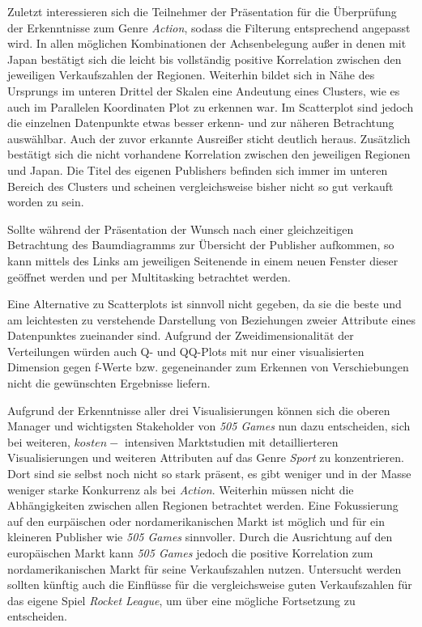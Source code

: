 \documentclass[usegeometry=true]{scrartcl}
\begin{document}
Zuletzt interessieren sich die Teilnehmer der Präsentation für die Überprüfung der Erkenntnisse zum Genre \textit{Action}, sodass die Filterung entsprechend angepasst wird. 
In allen möglichen Kombinationen der Achsenbelegung außer in denen mit Japan bestätigt sich die leicht bis vollständig positive Korrelation zwischen den jeweiligen Verkaufszahlen der Regionen.
Weiterhin bildet sich in Nähe des Ursprungs im unteren Drittel der Skalen eine Andeutung eines Clusters, wie es auch im Parallelen Koordinaten Plot zu erkennen war. 
Im Scatterplot sind jedoch die einzelnen Datenpunkte etwas besser erkenn- und zur näheren Betrachtung auswählbar. 
Auch der zuvor erkannte Ausreißer sticht deutlich heraus. 
Zusätzlich bestätigt sich die nicht vorhandene Korrelation zwischen den jeweiligen Regionen und Japan.
Die Titel des eigenen Publishers befinden sich immer im unteren Bereich des Clusters und scheinen vergleichsweise bisher nicht so gut verkauft worden zu sein. 

Sollte während der Präsentation der Wunsch nach einer gleichzeitigen Betrachtung des Baumdiagramms zur Übersicht der Publisher aufkommen, so kann mittels des Links am jeweiligen Seitenende in einem neuen Fenster dieser geöffnet werden und per Multitasking betrachtet werden.

Eine Alternative zu Scatterplots ist sinnvoll nicht gegeben, da sie die beste und am leichtesten zu verstehende Darstellung von Beziehungen zweier Attribute eines Datenpunktes zueinander sind. 
Aufgrund der Zweidimensionalität der Verteilungen würden auch Q- und QQ-Plots mit nur einer visualisierten Dimension gegen f-Werte bzw. gegeneinander zum Erkennen von Verschiebungen nicht die gewünschten Ergebnisse liefern.

Aufgrund der Erkenntnisse aller drei Visualisierungen können sich die oberen Manager und wichtigsten Stakeholder von \textit{505 Games} nun dazu entscheiden, sich bei weiteren, \(kosten-\) intensiven Marktstudien mit detaillierteren Visualisierungen und weiteren Attributen auf das Genre \textit{Sport} zu konzentrieren. 
Dort sind sie selbst noch nicht so stark präsent, es gibt weniger und in der Masse weniger starke Konkurrenz als bei \textit{Action}. 
Weiterhin müssen nicht die Abhängigkeiten zwischen allen Regionen betrachtet werden. 
Eine Fokussierung auf den eurpäischen oder nordamerikanischen Markt ist möglich und für ein kleineren Publisher wie \textit{505 Games} sinnvoller. 
Durch die Ausrichtung auf den europäischen Markt kann \textit{505 Games} jedoch die positive Korrelation zum nordamerikanischen Markt für seine Verkaufszahlen nutzen.
Untersucht werden sollten künftig auch die Einflüsse für die vergleichsweise guten Verkaufszahlen für das eigene Spiel \textit{Rocket League}, um über eine mögliche Fortsetzung zu entscheiden.
 
\end{document}
